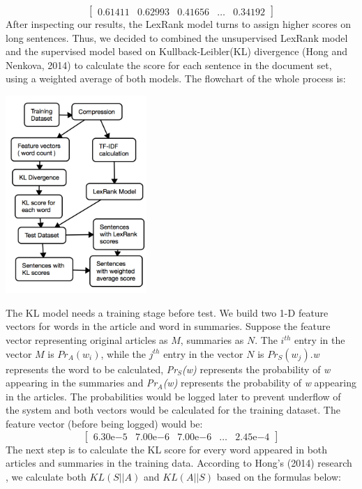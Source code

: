 \documentclass[11pt]{article}
\begin{document}
\[
\begin{bmatrix}
    0.61411      & 0.62993 & 0.41656 & \dots & 0.34192
\end{bmatrix}
\]
\indent
After inspecting our results, the LexRank model turns to assign higher scores on long sentences. Thus, we decided to combined the unsupervised LexRank model and the supervised model based on Kullback-Leibler(KL) divergence (Hong and Nenkova, 2014) to calculate the score for each sentence in the document set, using a weighted average of both models. The flowchart of the whole process is:\\
\begin{center}
\includegraphics[width=0.4\textwidth]{cs_flow.png}
\end{center}
\indent
The KL model needs a training stage before test. We build two 1-D feature vectors for words in the article and word in summaries. Suppose the feature vector representing original articles as $M$, summaries as $N$. The $i^{th}$ entry in the vector $M$ is $Pr_A(w_i)$, while the $j^{th}$ entry in the vector $N$ is $Pr_S(w_j)$.\emph{w} represents the word to be calculated, \emph{Pr$_S$(w)} represents the probability of \emph{w} appearing in the summaries and \emph{Pr$_A$(w)} represents the probability of \emph{w} appearing in the articles. The probabilities would be logged later to prevent underflow of the system and both vectors would be calculated for the training dataset. The feature vector (before being logged) would be:\\
\[
\begin{bmatrix}
    6.30\mathrm{e}{-5} & 7.00\mathrm{e}{-6} & 7.00\mathrm{e}{-6} & \dots & 2.45\mathrm{e}{-4}
\end{bmatrix}
\]
\indent
The next step is to calculate the KL score for every word appeared in both articles and summaries in the training data. According to Hong’s (2014) research , we calculate both $KL(S||A)$ and $KL(A||S)$ based on the formulas below: 
\end{document}
